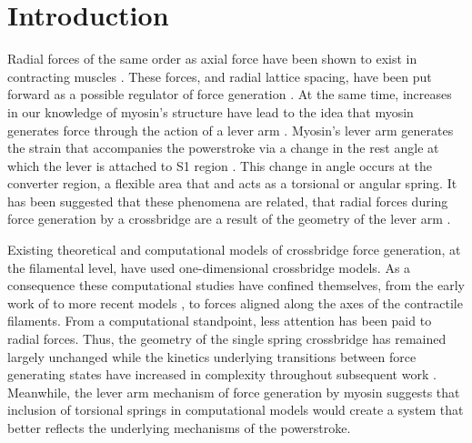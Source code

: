 \documentclass[]{article}
\begin{document}
\section{Introduction} %


Radial forces of the same order as axial force have been shown to exist in  contracting muscles \citep{Cecchi1990, Millman1998}. 
These forces, and radial lattice spacing, have been put forward as a possible regulator of force generation \citep{Fuchs2005}. 
At the same time, increases in our knowledge of myosin's structure have lead to the idea that myosin generates force through the action of a lever arm \citep{Rayment1993, Uyeda1996, Huxley2000}.
Myosin's lever arm generates the strain that accompanies the powerstroke via a change in the rest angle at which the lever is attached to S1 region \citep{Huxley2000, Houdusse:2001:p182}. 
This change in angle occurs at the converter region, a flexible area that and acts as a torsional or angular spring. 
It has been suggested that these phenomena are related, that radial forces during force generation by a crossbridge are a result of the geometry of the lever arm \citep{Schoenberg1980b}. 

Existing theoretical and computational models of crossbridge force generation, at the filamental level, have used one-dimensional crossbridge models. 
As a consequence these computational studies have confined themselves, from the early work of \citet{Huxley1957} to more recent models \citep{Daniel1998, Chase:2004:p204, Tanner:2007:pe115}, to forces aligned along the axes of the contractile filaments.  
From a computational standpoint, less attention has been paid to radial forces. 
Thus, the geometry of the single spring crossbridge has remained largely unchanged while the kinetics underlying transitions between force generating states have increased in complexity throughout subsequent work \citep{Pate1989, Daniel1998, Tanner:2007:pe115}.
Meanwhile, the lever arm mechanism of force generation by myosin suggests that inclusion of torsional springs in computational models would create a system that better reflects the underlying mechanisms of the powerstroke. 
\end{document}
